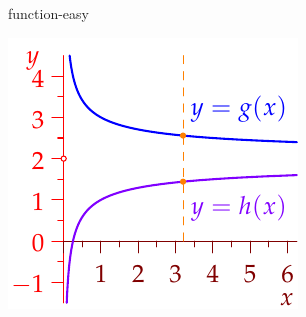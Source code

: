 \begin{example}{}{function-easy}
\begin{description}
\begin{minipage}[t]{0.31\linewidth}
	\includegraphics{functions-easyex2}
	\end{minipage}
\end{description}
\end{example}





